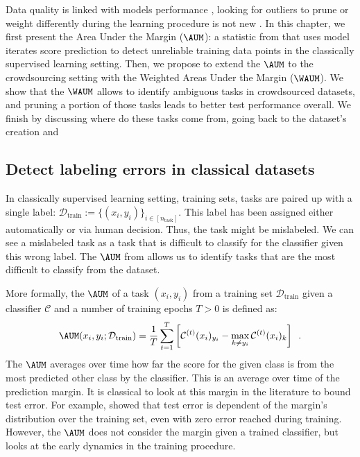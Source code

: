 Data quality is linked with models performance \citep{budach2022effects}, looking for outliers to prune or weight differently during the learning procedure is not new \citep{angelova2004data}.
In this chapter, we first present the Area Under the Margin ($\AUM$): a statistic from \citet{pleiss_identifying_2020} that uses model iterates score prediction to detect unreliable training data points in the classically supervised learning setting.
Then, we propose to extend the $\AUM$ to the crowdsourcing setting with the Weighted Areas Under the Margin ($\WAUM$).
We show that the $\WAUM$ allows to identify ambiguous tasks in crowdsourced datasets, and pruning a portion of those tasks leads to better test performance overall.
We finish by discussing where do these tasks come from, going back to the dataset's creation and 

\subsection{Detect labeling errors in classical datasets}
In classically supervised learning setting, training sets, tasks are paired up with a single label: $\mathcal{D}_\text{train}:=\{(x_i,y_i)\}_{i\in [n_\text{task}]}$.
This label has been assigned either automatically or via human decision.
Thus, the task might be mislabeled.
We can see a mislabeled task as a task that is difficult to classify for the classifier given this wrong label.
The $\AUM$ from \citet{pleiss_identifying_2020} allows us to identify tasks that are the most difficult to classify from the dataset.

More formally, the $\AUM$ of a task $(x_i,y_i)$ from a training set $\mathcal{D}_\text{train}$ given a classifier $\mathcal{C}$ and a number of training epochs $T>0$ is defined as:
\begin{equation}\label{eq:aum}
    \AUM(x_i, y_i; \mathcal{D}_\text{train}) = \frac{1}{T}\sum_{t=1}^T \left[\mathcal{C}^{(t)}(x_i)_{y_i} - \max_{k\neq y_i} \mathcal{C}^{(t)}(x_i)_k\right] \enspace.
\end{equation}
The $\AUM$ averages over time how far the score for the given class is from the most predicted other class by the classifier.
This is an average over time of the prediction margin.
It is classical to look at this margin in the literature to bound test error.
For example, \citet{bartlett1998boosting} showed that test error is dependent of the margin's distribution over the training set, even with zero error reached during training. 
However, the $\AUM$ does not consider the margin given a trained classifier, but looks at the early dynamics in the training procedure.

